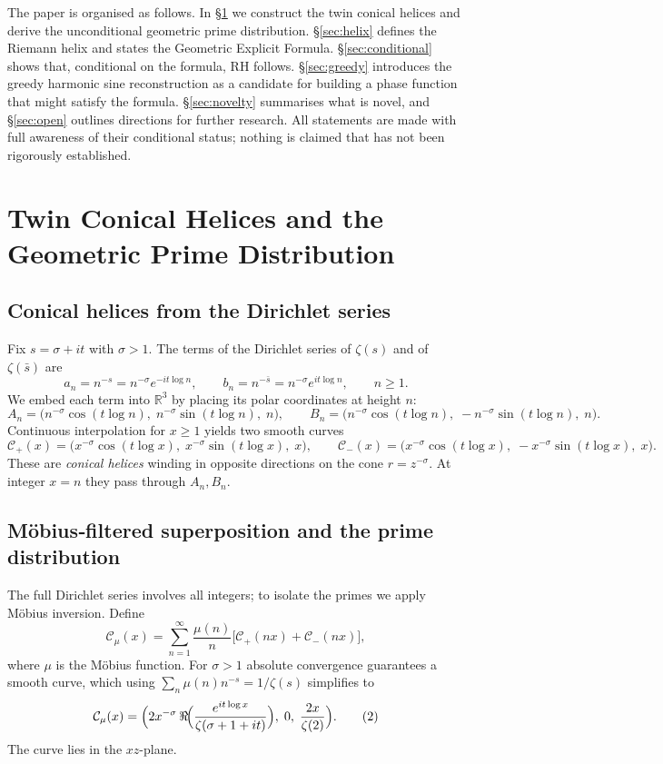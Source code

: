 \documentclass[11pt,a4paper]{article}
\newcommand{\R}{\mathbb{R}}
\begin{document}
The paper is organised as follows.  In \S\ref{sec:twin} we construct the twin conical helices and derive the unconditional geometric prime distribution.  \S\ref{sec:helix} defines the Riemann helix and states the Geometric Explicit Formula.  \S\ref{sec:conditional} shows that, conditional on the formula, RH follows.  \S\ref{sec:greedy} introduces the greedy harmonic sine reconstruction as a candidate for building a phase function that might satisfy the formula.  \S\ref{sec:novelty} summarises what is novel, and \S\ref{sec:open} outlines directions for further research.  All statements are made with full awareness of their conditional status; nothing is claimed that has not been rigorously established.

\section{Twin Conical Helices and the Geometric Prime Distribution}\label{sec:twin}

\subsection{Conical helices from the Dirichlet series}
Fix \(s = \sigma + i t\) with \(\sigma > 1\).  The terms of the Dirichlet series of \(\zeta(s)\) and of \(\zeta(\bar s)\) are
\[
a_n = n^{-s} = n^{-\sigma} e^{-i t \log n},\qquad
b_n = n^{-\bar s} = n^{-\sigma} e^{i t \log n},\qquad n\ge 1 .
\]
We embed each term into \(\R^3\) by placing its polar coordinates at height \(n\):
\[
A_n = \bigl( n^{-\sigma}\cos(t\log n),\; n^{-\sigma}\sin(t\log n),\; n \bigr),\qquad
B_n = \bigl( n^{-\sigma}\cos(t\log n),\; -n^{-\sigma}\sin(t\log n),\; n \bigr).
\]
Continuous interpolation for \(x\ge 1\) yields two smooth curves
\begin{equation}\label{twin}
\mathcal{C}_+(x) = \bigl( x^{-\sigma}\cos(t\log x),\;  x^{-\sigma}\sin(t\log x),\; x \bigr),\qquad
\mathcal{C}_-(x) = \bigl( x^{-\sigma}\cos(t\log x),\; -x^{-\sigma}\sin(t\log x),\; x \bigr).
\end{equation}
These are \emph{conical helices} winding in opposite directions on the cone \(r = z^{-\sigma}\).  At integer \(x=n\) they pass through \(A_n, B_n\).

\subsection{M\"obius‑filtered superposition and the prime distribution}
The full Dirichlet series involves all integers; to isolate the primes we apply M\"obius inversion.  Define
\[
\mathcal{C}_\mu(x) = \sum_{n=1}^{\infty} \frac{\mu(n)}{n} \bigl[ \mathcal{C}_+(n x) + \mathcal{C}_-(n x) \bigr],
\]
where \(\mu\) is the M\"obius function.  For \(\sigma > 1\) absolute convergence guarantees a smooth curve, which using \(\sum_{n}\mu(n)n^{-s}=1/\zeta(s)\) simplifies to
\[
\mathcal{C}_\mu(x) = \Bigl( 2x^{-\sigma}\,\Re\!\Bigl( \frac{e^{i t\log x}}{\zeta(\sigma+1+it)} \Bigr),\; 0,\; \frac{2x}{\zeta(2)} \Bigr). \tag{2}
\]
The curve lies in the \(xz\)-plane.
\end{document}
